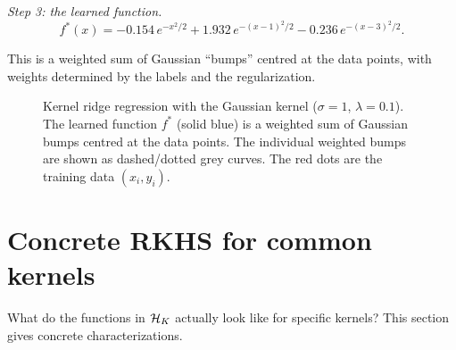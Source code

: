 \begin{notechapter}
\begin{example}
\emph{Step 3: the learned function.}
\[
f^*(x) = -0.154\,e^{-x^2/2} + 1.932\,e^{-(x-1)^2/2} - 0.236\,e^{-(x-3)^2/2}.
\]

This is a weighted sum of Gaussian ``bumps'' centred at the data
points, with weights determined by the labels and the regularization.
\end{example}

\begin{figure}[ht]
\centering
{}
\caption{Kernel ridge regression with the Gaussian kernel ($\sigma=1$,
$\lambda=0.1$). The learned function $f^*$ (solid blue) is a weighted
sum of Gaussian bumps centred at the data points. The individual
weighted bumps are shown as dashed/dotted grey curves. The red dots are
the training data $(x_i, y_i)$.}
\label{rkhs:fig:kernel_ridge}
\end{figure}

\section{Concrete RKHS for common kernels}
\label{rkhs:sec:examples_rkhs}

What do the functions in $\mathcal{H}_K$ actually look like for specific kernels?
This section gives concrete characterizations.


\end{notechapter}
